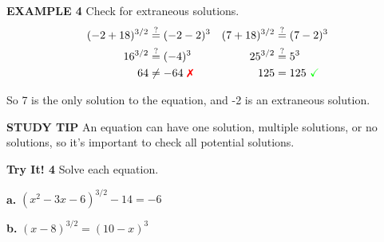 \documentclass{article}
\newenvironment{concept-box}{}{}
\newenvironment{example}[1]{\textbf{EXAMPLE #1}\quad}{}
\newenvironment{tryit}[1]{\textbf{Try It! #1}\quad}{}
\newcommand{\answer}[1]{}
\begin{document}
\begin{example}{4}
Check for extraneous solutions.
\begin{align*}
(-2 + 18)^{3/2} &\stackrel{?}{=} (-2 - 2)^3 & (7 + 18)^{3/2} &\stackrel{?}{=} (7 - 2)^3 \\
16^{3/2} &\stackrel{?}{=} (-4)^3 & 25^{3/2} &\stackrel{?}{=} 5^3 \\
64 &\neq -64 \ \text{\textcolor{red}{\ding{55}}} & 125 &= 125 \ \text{\textcolor{green}{\checkmark}}
\end{align*}

So 7 is the only solution to the equation, and -2 is an extraneous solution.
\end{example}

\begin{concept-box}
\textbf{STUDY TIP}
An equation can have one solution, multiple solutions, or no solutions, so it's important to check all potential solutions.
\end{concept-box}

\begin{tryit}{4}
Solve each equation.

\textbf{a.} $(x^2 - 3x - 6)^{3/2} - 14 = -6$ \quad \answer{$x = 10, -7$}

\textbf{b.} $(x - 8)^{3/2} = (10 - x)^3$ \quad \answer{$x = 9$}
\end{tryit}

\clearpage
\end{document}
